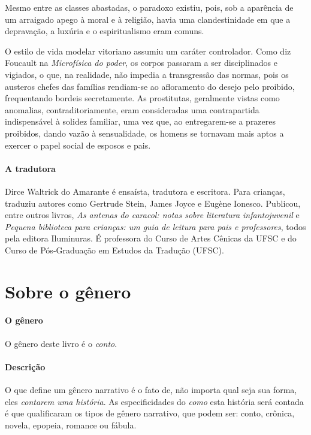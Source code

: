 \documentclass[11pt]{extarticle}
\begin{document}
Mesmo entre as classes abastadas, o paradoxo existiu, pois, sob a aparência de um arraigado
apego à moral e à religião, havia uma clandestinidade em que a depravação, a luxúria
e o espiritualismo eram comuns.

O estilo de vida modelar vitoriano assumiu um caráter controlador.
Como diz Foucault na \textit{Microfísica do poder}, os corpos passaram a ser disciplinados e vigiados, 
o que, na realidade, não impedia a transgressão das normas, pois os
austeros chefes das famílias rendiam-se ao afloramento do desejo pelo proibido, frequentando
bordeis secretamente. As prostitutas, geralmente vistas como anomalias, contraditoriamente,
eram consideradas uma contrapartida indispensável à solidez familiar, uma vez que, ao
entregarem-se a prazeres proibidos, dando vazão à sensualidade, os homens se tornavam mais
aptos a exercer o papel social de esposos e pais. 

\paragraph{A tradutora}

Dirce Waltrick do Amarante é ensaísta, tradutora e escritora. Para crianças, traduziu autores como Gertrude Stein, James Joyce e Eugène Ionesco. Publicou, entre outros livros, \textit{As antenas do caracol: notas sobre literatura infantojuvenil} e \textit{Pequena biblioteca para crianças: um guia de leitura para pais e professores}, todos pela editora Iluminuras. É professora do Curso de Artes Cênicas da UFSC e do Curso de Pós-Graduação em Estudos da Tradução (UFSC).

\section{Sobre o gênero}

\paragraph{O gênero} O gênero deste livro é o \textit{conto}. 

\paragraph{Descrição} O que define um gênero narrativo é o fato de, não importa
qual seja sua forma, eles \textit{contarem uma história}.
As especificidades do \textit{como} esta história será contada é que
qualificaram os tipos de gênero narrativo, que podem ser: conto, crônica, novela,
epopeia, romance ou fábula. 
\end{document}
